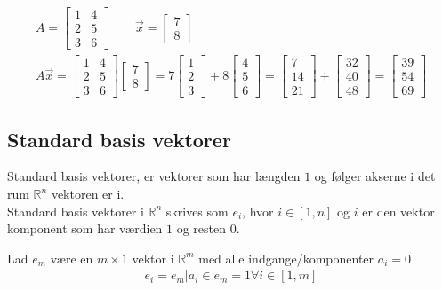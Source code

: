\begin{eks}
\begin{align*}
A=
\begin{bmatrix}
1 & 4\\
2 & 5\\
3 & 6
\end{bmatrix}
\qquad
\vec{x}=
\begin{bmatrix}
7\\
8
\end{bmatrix} \\
A\vec{x}= \begin{bmatrix}
1 & 4\\
2 & 5\\
3 & 6
\end{bmatrix}
\begin{bmatrix}
7\\
8
\end{bmatrix}
=
7
\begin{bmatrix}
1\\
2\\
3
\end{bmatrix}
+ 8
\begin{bmatrix}
4\\
5\\
6
\end{bmatrix}=
\begin{bmatrix}
7\\
14\\
21
\end{bmatrix}
+
\begin{bmatrix}
32\\
40\\
48
\end{bmatrix}
=
\begin{bmatrix}
39\\
54\\
69
\end{bmatrix}
\end{align*}
\end{eks}
\subsection{Standard basis vektorer}
Standard basis vektorer, er vektorer som har længden $1$ og følger akserne i det rum $\mathds{R}^n$ vektoren er i.\\
Standard basis vektorer i $\mathds{R}^n$ skrives som $e_i$, hvor $i\in[1,n]$ og $i$ er den vektor komponent som har værdien $1$ og resten $0$.

\begin{defn}
Lad $e_m$ være en $m\times 1$ vektor i $\mathds{R}^m$ med alle indgange/komponenter $a_i=0$
\begin{align*}
e_i=e_m|a_i\in e_m=1 \forall i\in[1,m] %
\end{align*}

\end{defn}